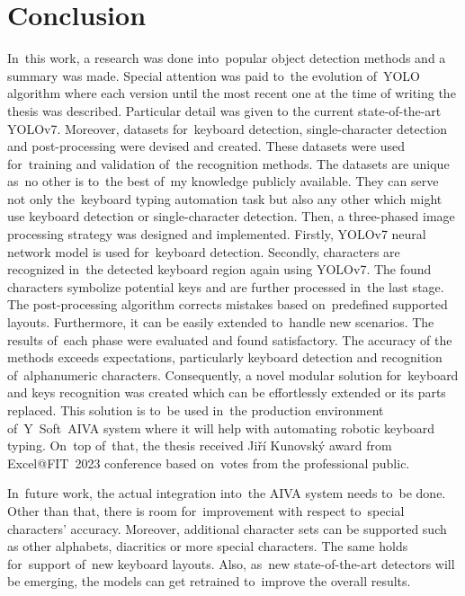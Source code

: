 \chapter{Conclusion}
\label{conclusion}

In~this work, a research was done into~popular object detection methods and a summary was made. Special attention was paid to~the evolution of~YOLO algorithm where each version until the most recent one at the time of writing the thesis was described. Particular detail was given to the current state-of-the-art YOLOv7. Moreover, datasets for~keyboard detection, single-character detection and post-processing were devised and created. These datasets were used for~training and validation of~the recognition methods. The datasets are unique as~no other is to~the best of~my knowledge publicly available. They can serve not only the~keyboard typing automation task but also any other which might use keyboard detection or single-character detection. Then, a three-phased image processing strategy was designed and implemented. Firstly, YOLOv7 neural network model is used for~keyboard detection. Secondly, characters are recognized in~the detected keyboard region again using YOLOv7. The found characters symbolize potential keys and are further processed in~the last stage. The post-processing algorithm corrects mistakes based on~predefined supported layouts. Furthermore, it can be easily extended to~handle new scenarios. The results of~each phase were evaluated and found satisfactory. The accuracy of the methods exceeds expectations, particularly keyboard detection and recognition of~alphanumeric characters. Consequently, a novel modular solution for~keyboard and keys recognition was created which can be effortlessly extended or its parts replaced. This solution is to~be used in~the production environment of~Y~Soft~AIVA system where it will help with automating robotic keyboard typing. On~top of~that, the thesis received Jiří Kunovský award from Excel@FIT~2023 conference based on~votes from the professional public.

In~future work, the actual integration into~the AIVA system needs to~be done. Other than that, there is room for~improvement with respect to~special characters' accuracy. Moreover, additional character sets can be supported such as other alphabets, diacritics or more \hbox{special} characters. The same holds for~support of~new keyboard layouts. Also, as~new state-of-the-art detectors will be emerging, the models can get retrained to~improve the overall results.



